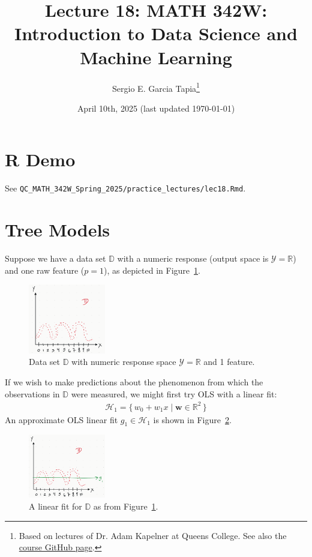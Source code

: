 \documentclass[12pt, a4paper]{article}
\title{Lecture 18: MATH 342W: Introduction to Data Science and Machine Learning}
\author{Sergio E. Garcia Tapia\thanks{Based on lectures of Dr. Adam Kapelner at Queens College.
See also the \href{https://github.com/kapelner/QC_MATH_342W_Spring_2025}{course GitHub page}.}}
\date{April 10th, 2025 (last updated \today)}
\theoremstyle{definition}
\begin{document}
	\maketitle
	\section*{R Demo}
	See \verb|QC_MATH_342W_Spring_2025/practice_lectures/lec18.Rmd|.
	\section*{Tree Models}
	Suppose we have a data set $\mathbb{D}$ with a numeric response (output space
	is $\mathcal{Y}=\mathbb{R}$) and one raw feature ($p = 1$), as depicted in 
	Figure~\ref{fig:data-set-numeric-response-1-feature}.
	\begin{figure}
		\centering
		\includegraphics[width=0.3\textwidth]{data-set-numeric-response-1-feature}
		\caption{Data set $\mathbb{D}$ with numeric response space $\mathcal{Y}=\mathbb{R}$
			and 1 feature.}
		\label{fig:data-set-numeric-response-1-feature}
	\end{figure}
	If we wish to make predictions about the phenomenon from which the observations
	in $\mathbb{D}$ were measured, we might first try OLS with a linear fit:
	\begin{align*}
		\mathcal{H}_1 = \{\,
		w_0 + w_1 x \mid \bm{w}\in \mathbb{R}^2
		\,\}
	\end{align*}
	An approximate OLS linear fit $g_1\in \mathcal{H}_1$ is shown in
	Figure~\ref{fig:data-set-numeric-response-1-feature-linear}.
	\begin{figure}
		\centering
		\includegraphics[width=0.3\textwidth]{data-set-numeric-response-1-feature-ols-linear}
		\caption{A linear fit for $\mathbb{D}$ as from Figure~\ref{fig:data-set-numeric-response-1-feature}.}
		\label{fig:data-set-numeric-response-1-feature-linear}
	\end{figure}
\end{document}
